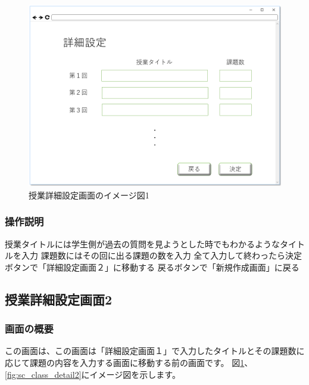 \begin{figure}[htbp]
\begin{center}
  \includegraphics[width=1\linewidth,clip]{./img/sc_class_detail1.png}
  \caption{授業詳細設定画面のイメージ図1}\label{fig:sc_class_detail1}
\end{center}
\end{figure}

\subsubsection{操作説明}
授業タイトルには学生側が過去の質問を見ようとした時でもわかるようなタイトルを入力
課題数にはその回に出る課題の数を入力
全て入力して終わったら決定ボタンで「詳細設定画面２」に移動する
戻るボタンで「新規作成画面」に戻る

\newpage

\subsection{授業詳細設定画面2}
\subsubsection{画面の概要}
この画面は、この画面は「詳細設定画面１」で入力したタイトルとその課題数に応じて課題の内容を入力する画面に移動する前の画面です。
図\ref{fig:sc_class_detail1}、\ref{fig:sc_class_detail2}にイメージ図を示します。

